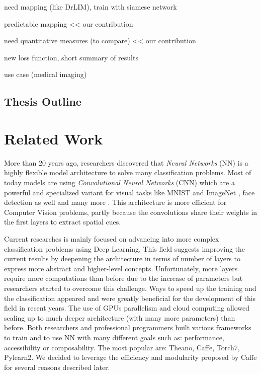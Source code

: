 \documentclass[a4paper,12pt]{report}
\begin{document}
need mapping (like DrLIM), train with siamese network

predictable mapping << our contribution

need quantitative measures (to compare) << our contribution

new loss function, short summary of results

use case (medical imaging)

\section{Thesis Outline}


\chapter{Related Work}

More than 20 years ago, researchers discovered that {\em Neural Networks} (NN) is a highly flexible model architecture to solve many classification problems.
Most of today models are using {\em Convolutional Neural Networks} (CNN) which are a powerful and specialized variant for visual tasks like MNIST \cite{mnist_web} and ImageNet \cite{krizhevsky2012imagenet}, face detection as well \cite{rowley1998neural} and many more \cite{prechelt1994proben1}.
This architecture is more efficient for Computer Vision problems, partly because the convolutions share their weights in the first layers to extract spatial cues.

Current researches is mainly focused on advancing into more complex classification problems using Deep Learning.
This field suggests improving the current results by deepening the architecture in terms of number of layers to express more abstract and higher-level concepts.
Unfortunately, more layers require more computations than before due to the increase of parameters but researchers started to overcome this challenge.
Ways to speed up the training and the classification appeared and were greatly beneficial for the development of this field in recent years\cite{ciresan2011flexible}\cite{schmidhuber2015deep}\cite{nasse2009face}.
The use of GPUs parallelism and cloud computing allowed scaling up to much deeper architecture (with many more parameters) than before\cite{coates2013deep}.
Both researchers and professional programmers built various frameworks to train and to use NN with many different goals such as: performance, accessibility or composability.
The most popular are: Theano\cite{bastien2012theano}, Caffe\cite{jia2014caffe}, Torch7\cite{collobert2011torch7}, Pylearn2\cite{goodfellow2013pylearn2}.
We decided to leverage the efficiency and modularity proposed by Caffe for several reasons described later.
\end{document}

